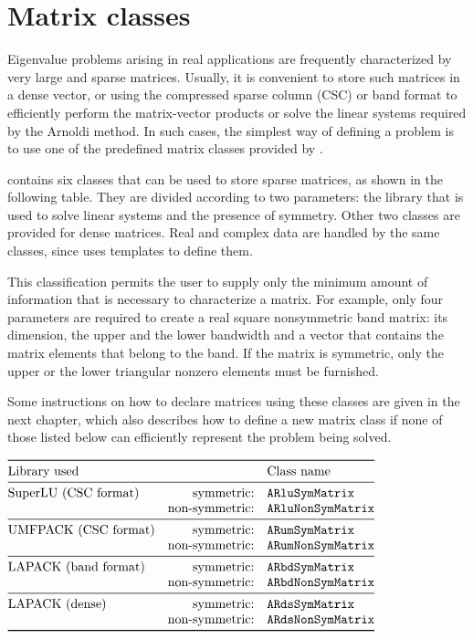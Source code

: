 \section{Matrix classes}

Eigenvalue problems arising in real applications are frequently characterized by very large and sparse matrices. Usually, it is convenient to store such matrices in a dense vector, or using the compressed sparse column (CSC) or band format to efficiently perform the matrix-vector products or solve the linear systems required by the Arnoldi method. In such cases, the simplest way of defining a problem is to use one of the predefined matrix classes provided by \ARPP{}.

\ARPP{} contains six classes that can be used to store sparse matrices, as shown in the following table. They are divided according to two parameters: the library that is used to solve linear systems and the presence of symmetry. Other two classes are provided for dense matrices. Real and complex data are handled by the same classes, since \ARPP{} uses templates to define them.

This classification permits the user to supply only the minimum amount of information that is necessary to characterize a matrix. For example, only four parameters are required to create a real square nonsymmetric band matrix: its dimension, the upper and the lower bandwidth and a vector that contains the matrix elements that belong to the band. If the matrix is symmetric, only the upper or the lower triangular nonzero elements must be furnished.

Some instructions on how to declare matrices using these classes are given in the next chapter, which also describes how to define a new matrix class if none of those listed below can efficiently represent the problem being solved.

\begin{center}
	\renewcommand{\arraystretch}{1.2}
	$\begin{array}{@{}lrl@{}}\toprule
	\text{Library used} & & \text{Class name} \\\midrule
	\text{SuperLU (CSC format)} & \text{symmetric:} & \texttt{ARluSymMatrix}\\
	& \text{non-symmetric:} & \texttt{ARluNonSymMatrix}\\\midrule
	\text{UMFPACK (CSC format)} & \text{symmetric:} & \texttt{ARumSymMatrix}\\
	& \text{non-symmetric:} & \texttt{ARumNonSymMatrix}\\\midrule
	\text{LAPACK (band format)} & \text{symmetric:} & \texttt{ARbdSymMatrix}\\
	& \text{non-symmetric:} & \texttt{ARbdNonSymMatrix}\\\midrule
	\text{LAPACK (dense)} & \text{symmetric:} & \texttt{ARdsSymMatrix}\\
	& \text{non-symmetric:} & \texttt{ARdsNonSymMatrix}\\\bottomrule
	\end{array}$
\end{center}


